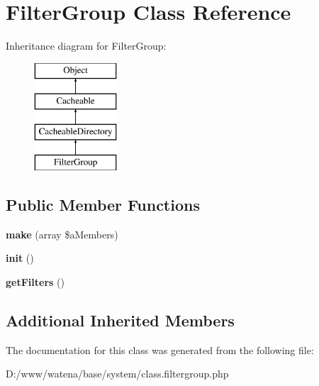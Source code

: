 \hypertarget{class_filter_group}{\section{Filter\-Group Class Reference}
\label{class_filter_group}
}
Inheritance diagram for Filter\-Group\-:\begin{figure}[H]
\begin{center}
\leavevmode
\includegraphics[height=4.000000cm]{class_filter_group}
\end{center}
\end{figure}
\subsection*{Public Member Functions}
\begin{DoxyCompactItemize}
\item 
\hypertarget{class_filter_group_a5a10ebb3bba8ea97cc9d67bbb5b5a920}{{\bfseries make} (array \$a\-Members)}\label{class_filter_group_a5a10ebb3bba8ea97cc9d67bbb5b5a920}

\item 
\hypertarget{class_filter_group_af10c7e89cbc739a12ce9b1e180957a25}{{\bfseries init} ()}\label{class_filter_group_af10c7e89cbc739a12ce9b1e180957a25}

\item 
\hypertarget{class_filter_group_a0bf75d63ea8eca7de1678f0c5fdc5be1}{{\bfseries get\-Filters} ()}\label{class_filter_group_a0bf75d63ea8eca7de1678f0c5fdc5be1}

\end{DoxyCompactItemize}
\subsection*{Additional Inherited Members}


The documentation for this class was generated from the following file\-:\begin{DoxyCompactItemize}
\item 
D\-:/www/watena/base/system/class.\-filtergroup.\-php\end{DoxyCompactItemize}
